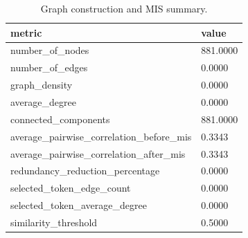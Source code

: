 \begin{table}[htbp]
\centering
\begin{tabular}{ll}
\hline
metric & value \\
\hline
number_of_nodes & 881.0000 \\
number_of_edges & 0.0000 \\
graph_density & 0.0000 \\
average_degree & 0.0000 \\
connected_components & 881.0000 \\
average_pairwise_correlation_before_mis & 0.3343 \\
average_pairwise_correlation_after_mis & 0.3343 \\
redundancy_reduction_percentage & 0.0000 \\
selected_token_edge_count & 0.0000 \\
selected_token_average_degree & 0.0000 \\
similarity_threshold & 0.5000 \\
\hline
\end{tabular}
\caption{Graph construction and MIS summary.}
\label{table_graph_statistics}
\end{table}